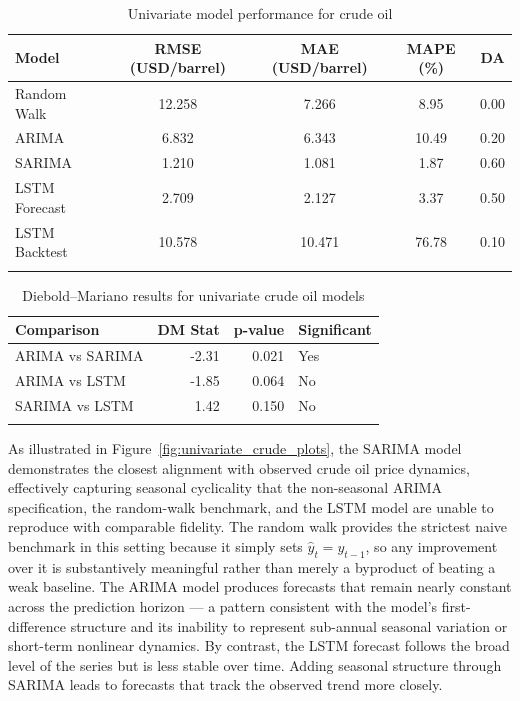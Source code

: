 \documentclass[pdflatex,sn-mathphys-num]{sn-jnl}%
\theoremstyle{thmstyleone}%
\theoremstyle{thmstyletwo}%
\theoremstyle{thmstylethree}%
\begin{document}
\begin{table}[h]
\centering
\caption{Univariate model performance for crude oil}
\label{tab:univariate_crude}
\begin{tabular}{@{}lcccc@{}}
\toprule
Model & RMSE (USD/barrel) & MAE (USD/barrel) & MAPE (\%) & DA \\
\midrule
Random Walk & 12.258 & 7.266 & 8.95 & 0.00 \\
ARIMA & 6.832 & 6.343 & 10.49 & 0.20 \\
SARIMA & 1.210 & 1.081 & 1.87 & 0.60 \\
LSTM Forecast & 2.709 & 2.127 & 3.37 & 0.50 \\
LSTM Backtest & 10.578 & 10.471 & 76.78 & 0.10 \\
\botrule
\end{tabular}
\end{table}

\begin{table}[h]
\centering
\small
\caption{Diebold--Mariano results for univariate crude oil models}
\label{tab:dm_univariate_oil}
\begin{tabular}{@{}lrrl@{}}
\toprule
Comparison & DM Stat & p-value & Significant \\
\midrule
ARIMA vs SARIMA & -2.31 & 0.021 & Yes \\
ARIMA vs LSTM & -1.85 & 0.064 & No \\
SARIMA vs LSTM & 1.42 & 0.150 & No \\
\botrule
\end{tabular}
\end{table}

As illustrated in Figure~\ref{fig:univariate_crude_plots}, the SARIMA model demonstrates the closest alignment with observed crude oil price dynamics, effectively capturing seasonal cyclicality that the non-seasonal ARIMA specification, the random-walk benchmark, and the LSTM model are unable to reproduce with comparable fidelity. The random walk provides the strictest naive benchmark in this setting because it simply sets $\hat{y}_t = y_{t-1}$, so any improvement over it is substantively meaningful rather than merely a byproduct of beating a weak baseline. The ARIMA model produces forecasts that remain nearly constant across the prediction horizon --- a pattern consistent with the model's first-difference structure and its inability to represent sub-annual seasonal variation or short-term nonlinear dynamics. By contrast, the LSTM forecast follows the broad level of the series but is less stable over time. Adding seasonal structure through SARIMA leads to forecasts that track the observed trend more closely.
\end{document}
